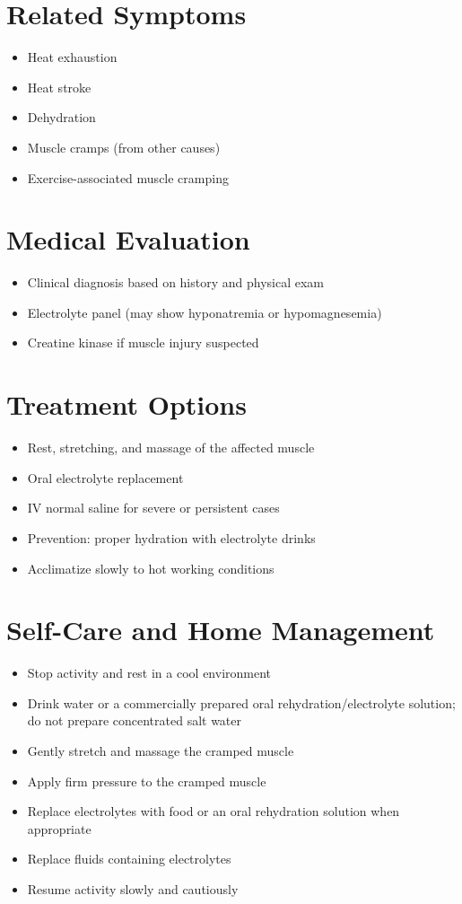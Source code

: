 \section*{Related Symptoms}
\begin{itemize}
\item Heat exhaustion
\item Heat stroke
\item Dehydration
\item Muscle cramps (from other causes)
\item Exercise-associated muscle cramping
\end{itemize}

\section*{Medical Evaluation}
\begin{itemize}
\item Clinical diagnosis based on history and physical exam
\item Electrolyte panel (may show hyponatremia or hypomagnesemia)
\item Creatine kinase if muscle injury suspected
\end{itemize}

\section*{Treatment Options}
\begin{itemize}
\item Rest, stretching, and massage of the affected muscle
\item Oral electrolyte replacement
\item IV normal saline for severe or persistent cases
\item Prevention: proper hydration with electrolyte drinks
\item Acclimatize slowly to hot working conditions
\end{itemize}
\section*{Self-Care and Home Management}
\begin{itemize}
\item Stop activity and rest in a cool environment
\item Drink water or a commercially prepared oral rehydration/electrolyte solution; do not prepare concentrated salt water
\item Gently stretch and massage the cramped muscle
\item Apply firm pressure to the cramped muscle
\item Replace electrolytes with food or an oral rehydration solution when appropriate
\item Replace fluids containing electrolytes
\item Resume activity slowly and cautiously
\end{itemize}

